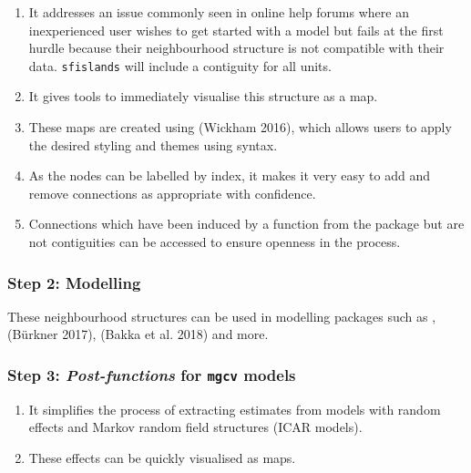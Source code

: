 \begin{enumerate}
\def\labelenumi{\arabic{enumi}.}
\item
  It addresses an issue commonly seen in online help forums where an inexperienced user wishes to get started with a model but fails at the first hurdle because their neighbourhood structure is not compatible with their data. \texttt{sfislands} will include a contiguity for all units.
\item
  It gives tools to immediately visualise this structure as a map.
\item
  These maps are created using  (Wickham 2016), which allows users to apply the desired styling and themes using  syntax.
\item
  As the nodes can be labelled by index, it makes it very easy to add and remove connections as appropriate with confidence.
\item
  Connections which have been induced by a function from the package but are not contiguities can be accessed to ensure openness in the process.
\end{enumerate}

\hypertarget{step-2-modelling}{%
\subsubsection{Step 2: Modelling}\label{step-2-modelling}}

These neighbourhood structures can be used in modelling packages such as ,  (Bürkner 2017),  (Bakka et al. 2018) and more.

\hypertarget{step-3-post-functions-for-mgcv-models}{%
\subsubsection{\texorpdfstring{Step 3: \emph{Post-functions} for \texttt{mgcv} models}{Step 3: Post-functions for mgcv models}}\label{step-3-post-functions-for-mgcv-models}}

\begin{enumerate}
\def\labelenumi{\arabic{enumi}.}
\item
  It simplifies the process of extracting estimates from models with random effects and Markov random field structures (ICAR models).
\item
  These effects can be quickly visualised as  maps.
\end{enumerate}


